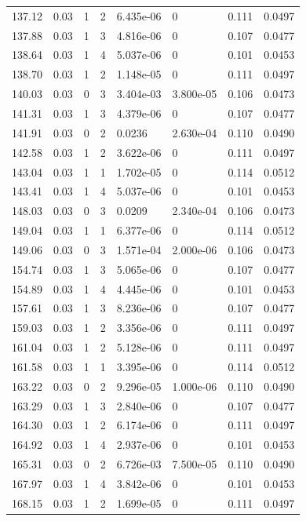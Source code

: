 \documentclass[preview]{standalone}
\begin{document}
{{{\begin{tabular}{L{1.2cm}C{1.2cm} C{0.3cm}C{0.5cm} C{1.4cm}C{1.4cm} C{1.4cm}C{1.4cm}}
  137.12  &  0.03  & 1     &  2 &  6.435e-06  & 0  & 0.111 &  0.0497   \\ 
  137.88  &  0.03  & 1     &  3 &  4.816e-06  & 0  & 0.107 &  0.0477   \\ 
  138.64  &  0.03  & 1     &  4 &  5.037e-06  & 0  & 0.101 &  0.0453   \\ 
  138.70  &  0.03  & 1     &  2 &  1.148e-05  & 0  & 0.111 &  0.0497   \\ 
  140.03  &  0.03  & 0     &  3 &  3.404e-03  & 3.800e-05  & 0.106 &  0.0473   \\ 
  141.31  &  0.03  & 1     &  3 &  4.379e-06  & 0  & 0.107 &  0.0477   \\ 
  141.91  &  0.03  & 0     &  2 &  0.0236  & 2.630e-04  & 0.110 &  0.0490   \\ 
  142.58  &  0.03  & 1     &  2 &  3.622e-06  & 0  & 0.111 &  0.0497   \\ 
  143.04  &  0.03  & 1     &  1 &  1.702e-05  & 0  & 0.114 &  0.0512   \\ 
  143.41  &  0.03  & 1     &  4 &  5.037e-06  & 0  & 0.101 &  0.0453   \\ 
  148.03  &  0.03  & 0     &  3 &  0.0209  & 2.340e-04  & 0.106 &  0.0473   \\ 
  149.04  &  0.03  & 1     &  1 &  6.377e-06  & 0  & 0.114 &  0.0512   \\ 
  149.06  &  0.03  & 0     &  3 &  1.571e-04  & 2.000e-06  & 0.106 &  0.0473   \\ 
  154.74  &  0.03  & 1     &  3 &  5.065e-06  & 0  & 0.107 &  0.0477   \\ 
  154.89  &  0.03  & 1     &  4 &  4.445e-06  & 0  & 0.101 &  0.0453   \\ 
  157.61  &  0.03  & 1     &  3 &  8.236e-06  & 0  & 0.107 &  0.0477   \\ 
  159.03  &  0.03  & 1     &  2 &  3.356e-06  & 0  & 0.111 &  0.0497   \\ 
  161.04  &  0.03  & 1     &  2 &  5.128e-06  & 0  & 0.111 &  0.0497   \\ 
  161.58  &  0.03  & 1     &  1 &  3.395e-06  & 0  & 0.114 &  0.0512   \\ 
  163.22  &  0.03  & 0     &  2 &  9.296e-05  & 1.000e-06  & 0.110 &  0.0490   \\ 
  163.29  &  0.03  & 1     &  3 &  2.840e-06  & 0  & 0.107 &  0.0477   \\ 
  164.30  &  0.03  & 1     &  2 &  6.174e-06  & 0  & 0.111 &  0.0497   \\ 
  164.92  &  0.03  & 1     &  4 &  2.937e-06  & 0  & 0.101 &  0.0453   \\ 
  165.31  &  0.03  & 0     &  2 &  6.726e-03  & 7.500e-05  & 0.110 &  0.0490   \\ 
  167.97  &  0.03  & 1     &  4 &  3.842e-06  & 0  & 0.101 &  0.0453   \\ 
  168.15  &  0.03  & 1     &  2 &  1.699e-05  & 0  & 0.111 &  0.0497   \\ 
\hline 
\end{tabular} 

}}}
\end{document}
